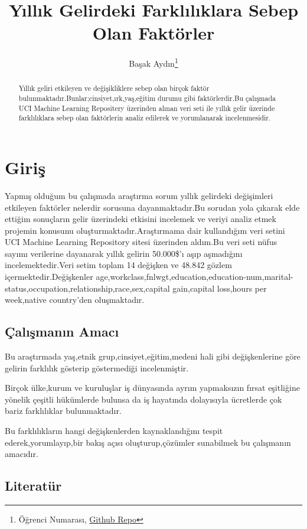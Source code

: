 \documentclass[
  12pt,
]{article}
\title{Yıllık Gelirdeki Farklılıklara Sebep Olan Faktörler}
\author{Başak Aydın\footnote{Öğrenci Numarası, \href{https://github.com/basakaaydin/istatistikfinal}{Github Repo}}}
\date{}
\begin{document}
\maketitle
\begin{abstract}
Yıllık geliri etkileyen ve değişikliklere sebep olan birçok faktör bulunmaktadır.Bunlar;cinsiyet,ırk,yaş,eğitim durumu gibi faktörlerdir.Bu çalışmada UCI Machine Learning Repositery üzerinden alınan veri seti ile yıllık gelir üzerinde farklılıklara sebep olan faktörlerin analiz edilerek ve yorumlanarak incelenmesidir.
\end{abstract}

\hypertarget{giriux15f}{%
\section{Giriş}\label{giriux15f}}

Yapmış olduğum bu çalışmada araştırma sorum yıllık gelirdeki değişimleri etkileyen faktörler nelerdir sorusuna dayanmaktadır.Bu sorudan yola çıkarak elde ettiğim sonuçların gelir üzerindeki etkisini incelemek ve veriyi analiz etmek projemin konusunu oluşturmaktadır.Araştırmama dair kullandığım veri setini UCI Machine Learning Repository sitesi üzerinden aldım.Bu veri seti nüfus sayımı verilerine dayanarak yıllık gelirin 50.000\$'ı aşıp aşmadığını incelemektedir.Veri setim toplam 14 değişken ve 48.842 gözlem içermektedir.Değişkenler age,workclass,fnlwgt,education,education-num,marital-status,occupation,relationship,race,sex,capital gain,capital loss,hours per week,native country'den oluşmaktadır.

\hypertarget{uxe7alux131ux15fmanux131n-amacux131}{%
\subsection{Çalışmanın Amacı}\label{uxe7alux131ux15fmanux131n-amacux131}}

Bu araştırmada yaş,etnik grup,cinsiyet,eğitim,medeni hali gibi değişkenlerine göre gelirin farklılık gösterip göstermediği incelenmiştir.

Birçok ülke,kurum ve kuruluşlar iş dünyasında ayrım yapmaksızın fırsat eşitliğine yönelik çeşitli hükümlerde bulunsa da iş hayatında dolayısıyla ücretlerde çok bariz farklılıklar bulunmaktadır.

Bu farklılıkların hangi değişkenlerden kaynaklandığını tespit ederek,yorumlayıp,bir bakış açısı oluşturup,çözümler sunabilmek bu çalışmanın amacıdır.

\hypertarget{literatuxfcr}{%
\subsection{Literatür}\label{literatuxfcr}}
\end{document}
